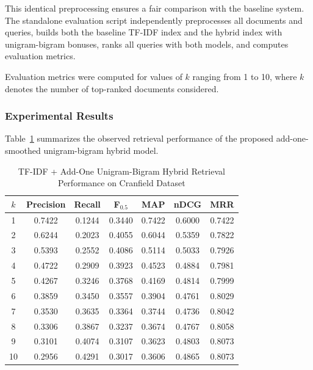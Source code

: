 This identical preprocessing ensures a fair comparison with the baseline system. The standalone evaluation script independently preprocesses all documents and queries, builds both the baseline TF-IDF index and the hybrid index with unigram-bigram bonuses, ranks all queries with both models, and computes evaluation metrics.

Evaluation metrics were computed for values of $k$ ranging from 1 to 10, where $k$ denotes the number of top-ranked documents considered.

\vspace{0.2cm}

\subsubsection{Experimental Results}

Table~\ref{tab:bigram_smoothing_metrics} summarizes the observed retrieval performance of the proposed add-one-smoothed unigram-bigram hybrid model.

\begin{table}[H]
\centering
\caption{TF-IDF + Add-One Unigram-Bigram Hybrid Retrieval Performance on Cranfield Dataset}
\label{tab:bigram_smoothing_metrics}
\begin{tabular}{|c|c|c|c|c|c|c|}
\hline
$k$ & Precision & Recall & F$_{0.5}$ & MAP & nDCG & MRR \\
\hline
1  & 0.7422 & 0.1244 & 0.3440 & 0.7422 & 0.6000 & 0.7422 \\
2  & 0.6244 & 0.2023 & 0.4055 & 0.6044 & 0.5359 & 0.7822 \\
3  & 0.5393 & 0.2552 & 0.4086 & 0.5114 & 0.5033 & 0.7926 \\
4  & 0.4722 & 0.2909 & 0.3923 & 0.4523 & 0.4884 & 0.7981 \\
5  & 0.4267 & 0.3246 & 0.3768 & 0.4169 & 0.4814 & 0.7999 \\
6  & 0.3859 & 0.3450 & 0.3557 & 0.3904 & 0.4761 & 0.8029 \\
7  & 0.3530 & 0.3635 & 0.3364 & 0.3744 & 0.4736 & 0.8042 \\
8  & 0.3306 & 0.3867 & 0.3237 & 0.3674 & 0.4767 & 0.8058 \\
9  & 0.3101 & 0.4074 & 0.3107 & 0.3623 & 0.4803 & 0.8073 \\
10 & 0.2956 & 0.4291 & 0.3017 & 0.3606 & 0.4865 & 0.8073 \\
\hline
\end{tabular}
\end{table}


